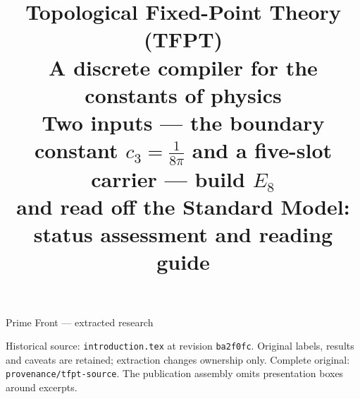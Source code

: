 \documentclass[11pt,a4paper]{article}
\title{\vspace{-1.2cm}\textbf{Topological Fixed-Point Theory (TFPT)}\\[1.5mm]
\Large A discrete compiler for the constants of physics\\[2.5mm]
\large Two inputs --- the boundary constant $c_3=\tfrac1{8\pi}$ and a five-slot carrier --- build $E_8$\\
and read off the Standard Model: status assessment and reading guide}
\author{\TFPTauthors}
\date{\TFPTdatestamp}
\begin{document}
\begin{center}\Large Prime Front --- extracted research\end{center}
\noindent Historical source: \texttt{introduction.tex} at revision \texttt{ba2f0fc}. Original labels, results and caveats are retained; extraction changes ownership only. Complete original: \texttt{provenance/tfpt-source}. The publication assembly omits presentation boxes around excerpts.
\tableofcontents
\clearpage

\end{document}

